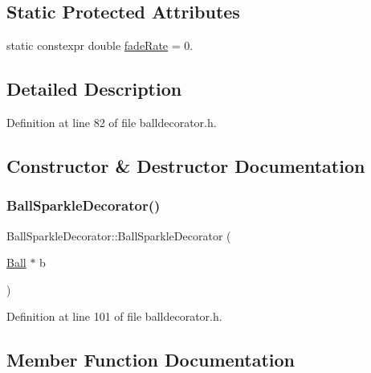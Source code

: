 \subsection*{Static Protected Attributes}
\begin{DoxyCompactItemize}
\item 
static constexpr double \mbox{\hyperlink{class_ball_sparkle_decorator_ad4e98ec20a12be0c8b0481879d4c2d17}{fade\+Rate}} = 0.
\end{DoxyCompactItemize}


\subsection{Detailed Description}


Definition at line 82 of file balldecorator.\+h.



\subsection{Constructor \& Destructor Documentation}
\mbox{\label{class_ball_sparkle_decorator_aebdaa2c5204a050a297c9255d885d0c3}} 
\subsubsection{\texorpdfstring{Ball\+Sparkle\+Decorator()}{BallSparkleDecorator()}}
{\footnotesize\ttfamily Ball\+Sparkle\+Decorator\+::\+Ball\+Sparkle\+Decorator (\begin{DoxyParamCaption}\item[{\mbox{\hyperlink{class_ball}{Ball}} $\ast$}]{b }\end{DoxyParamCaption})\hspace{0.3cm}{\ttfamily [inline]}}



Definition at line 101 of file balldecorator.\+h.



\subsection{Member Function Documentation}
\mbox{\label{class_ball_sparkle_decorator_a3f292b99228264bee08c672184ab6ad5}} 
